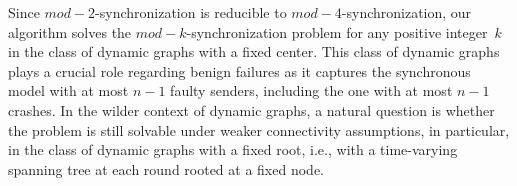 \documentclass[11pt,letterpaper]{article}
\begin{document}
Since $mod-2$-synchronization is reducible to $mod-4$-synchronization,
	 our algorithm solves the $mod-k$-synchronization problem for any positive integer~$k$
	 in the class of  dynamic  graphs with a fixed center.
This class of dynamic graphs plays a crucial role regarding benign failures as it captures 
	the synchronous model with at most $n-1$ faulty senders, including the one with at most $n-1$ crashes.
In the wilder context of dynamic graphs, a natural question is whether the problem is still solvable 
	under weaker connectivity assumptions, in particular, in the class of dynamic graphs with a fixed root, 
	i.e., with a time-varying spanning tree at each round rooted at a fixed node.


\printbibliography
\end{document}
